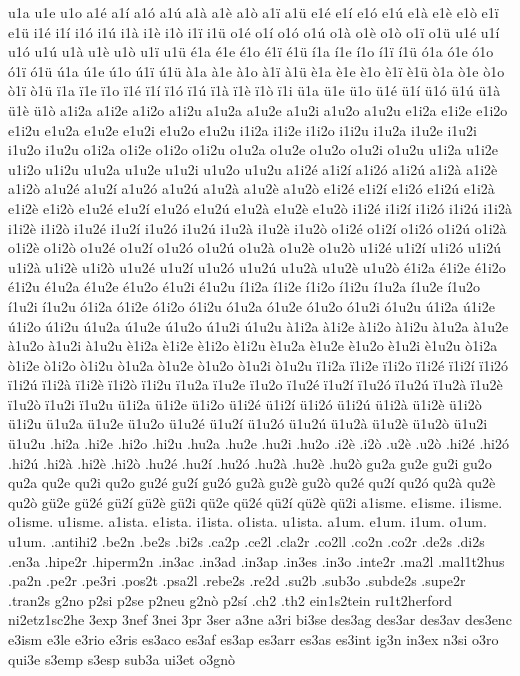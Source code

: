{u1a u1e u1o
a1é a1í a1ó a1ú a1à a1è
a1ò a1ï a1ü
e1é e1í e1ó e1ú e1à e1è
e1ò e1ï e1ü
i1é i1í i1ó i1ú i1à i1è
i1ò i1ï i1ü
o1é o1í o1ó o1ú o1à o1è
o1ò o1ï o1ü
u1é u1í u1ó u1ú u1à u1è
u1ò u1ï u1ü
é1a é1e é1o
é1ï é1ü
í1a í1e í1o
í1ï í1ü
ó1a ó1e ó1o
ó1ï ó1ü
ú1a ú1e ú1o
ú1ï ú1ü
à1a à1e à1o
à1ï à1ü
è1a è1e è1o
è1ï è1ü
ò1a ò1e ò1o
ò1ï ò1ü
ï1a ï1e ï1o ï1é ï1í
ï1ó ï1ú ï1à
ï1è ï1ò ï1i
ü1a ü1e ü1o ü1é ü1í
ü1ó ü1ú ü1à
ü1è ü1ò
%
a1i2a a1i2e a1i2o a1i2u
a1u2a a1u2e a1u2i a1u2o a1u2u
e1i2a e1i2e e1i2o e1i2u
e1u2a e1u2e e1u2i e1u2o e1u2u
i1i2a i1i2e i1i2o i1i2u
i1u2a i1u2e i1u2i i1u2o i1u2u
o1i2a o1i2e o1i2o o1i2u
o1u2a o1u2e o1u2o o1u2i o1u2u
u1i2a u1i2e u1i2o u1i2u
u1u2a u1u2e u1u2i u1u2o u1u2u
a1i2é a1i2í a1i2ó a1i2ú a1i2à
a1i2è a1i2ò
a1u2é a1u2í a1u2ó a1u2ú a1u2à
a1u2è a1u2ò
e1i2é e1i2í e1i2ó e1i2ú e1i2à
e1i2è e1i2ò
e1u2é e1u2í e1u2ó e1u2ú e1u2à
e1u2è e1u2ò
i1i2é i1i2í i1i2ó i1i2ú i1i2à
i1i2è i1i2ò
i1u2é i1u2í i1u2ó i1u2ú i1u2à
i1u2è i1u2ò
o1i2é o1i2í o1i2ó o1i2ú o1i2à
o1i2è o1i2ò
o1u2é o1u2í o1u2ó o1u2ú o1u2à
o1u2è o1u2ò
u1i2é u1i2í u1i2ó u1i2ú u1i2à
u1i2è u1i2ò
u1u2é u1u2í u1u2ó u1u2ú u1u2à
u1u2è u1u2ò
é1i2a é1i2e é1i2o é1i2u
é1u2a é1u2e é1u2o é1u2i é1u2u
í1i2a í1i2e í1i2o í1i2u
í1u2a í1u2e í1u2o í1u2i í1u2u
ó1i2a ó1i2e ó1i2o ó1i2u
ó1u2a ó1u2e ó1u2o ó1u2i ó1u2u
ú1i2a ú1i2e ú1i2o ú1i2u
ú1u2a ú1u2e ú1u2o ú1u2i ú1u2u
à1i2a à1i2e à1i2o à1i2u
à1u2a à1u2e à1u2o à1u2i à1u2u
è1i2a è1i2e è1i2o è1i2u
è1u2a è1u2e è1u2o è1u2i è1u2u
ò1i2a ò1i2e ò1i2o ò1i2u
ò1u2a ò1u2e ò1u2o ò1u2i ò1u2u
ï1i2a ï1i2e ï1i2o ï1i2é ï1i2í
ï1i2ó
ï1i2ú ï1i2à
ï1i2è ï1i2ò ï1i2u
ï1u2a ï1u2e ï1u2o ï1u2é ï1u2í
ï1u2ó
ï1u2ú ï1u2à
ï1u2è ï1u2ò ï1u2i ï1u2u
ü1i2a ü1i2e ü1i2o ü1i2é ü1i2í
ü1i2ó
ü1i2ú ü1i2à
ü1i2è ü1i2ò ü1i2u
ü1u2a ü1u2e ü1u2o ü1u2é ü1u2í
ü1u2ó
ü1u2ú ü1u2à
ü1u2è ü1u2ò ü1u2i ü1u2u
%
.hi2a .hi2e .hi2o .hi2u .hu2a .hu2e .hu2i .hu2o
.i2è .i2ò
.u2è .u2ò
.hi2é .hi2ó .hi2ú .hi2à .hi2è
.hi2ò
.hu2é .hu2í .hu2ó .hu2à .hu2è
.hu2ò
%
gu2a gu2e gu2i gu2o qu2a qu2e qu2i qu2o
gu2é gu2í gu2ó gu2à gu2è
gu2ò
qu2é qu2í qu2ó qu2à qu2è
qu2ò
gü2e gü2é gü2í gü2è gü2i
qü2e qü2é qü2í qü2è qü2i
%
a1isme. e1isme. i1isme. o1isme. u1isme.
a1ista. e1ista. i1ista. o1ista. u1ista.
a1um. e1um. i1um. o1um. u1um.
%
.antihi2 .be2n .be2s .bi2s .ca2p .ce2l .cla2r .co2ll .co2n .co2r .de2s
.di2s .en3a .hipe2r .hiperm2n .in3ac .in3ad .in3ap .in3es .in3o
.inte2r .ma2l .mal1t2hus .pa2n .pe2r .pe3ri .pos2t .psa2l .rebe2s
.re2d .su2b .sub3o .subde2s .supe2r .tran2s
%
g2no p2si p2se p2neu
g2nò p2sí
%
.ch2 .th2
ein1s2tein ru1t2herford ni2etz1sc2he
%
3exp 3nef 3nei 3pr 3ser a3ne a3ri bi3se des3ag des3ar des3av des3enc
e3ism e3le e3rio e3ris es3aco es3af es3ap es3arr es3as es3int
ig3n in3ex n3si o3ro qui3e s3emp s3esp sub3a ui3et
o3gnò
}
